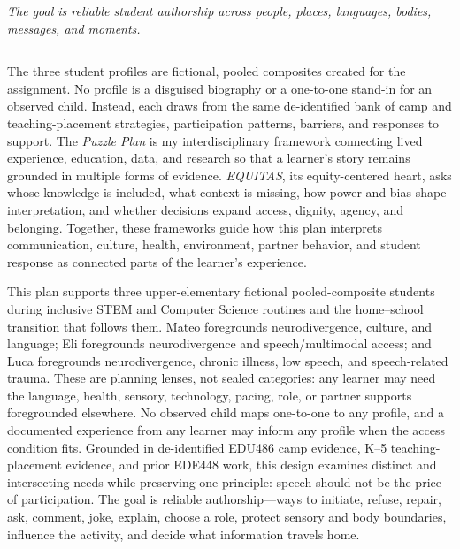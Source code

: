 \documentclass[11pt]{article}
\newcommand{\reviewsection}[1]{%
  \Needspace{4\baselineskip}
  \vspace{0.08in}\noindent{\normalsize\bfseries\color{PrimaryRed}#1}
  \par\vspace{0.025in}
}
\begin{document}
\begin{titlepage}
\vfill

\begin{center}
\begin{minipage}{1.00\textwidth}
\centering\itshape
The goal is reliable student authorship across people, places, languages, bodies, messages, and moments.\\
{\color{PrimaryRed}\rule{4.4in}{0.8pt}}
\end{minipage}
\end{center}

\vfill

\begin{center}
\begin{minipage}{0.99\textwidth}
\small
The three student profiles are fictional, pooled composites created for the assignment. No profile is a disguised biography or a one-to-one stand-in for an observed child. Instead, each draws from the same de-identified bank of camp and teaching-placement strategies, participation patterns, barriers, and responses to support. The \textit{Puzzle Plan} is my interdisciplinary framework connecting lived experience, education, data, and research so that a learner's story remains grounded in multiple forms of evidence. \textit{EQUITAS}, its equity-centered heart, asks whose knowledge is included, what context is missing, how power and bias shape interpretation, and whether decisions expand access, dignity, agency, and belonging. Together, these frameworks guide how this plan interprets communication, culture, health, environment, partner behavior, and student response as connected parts of the learner's experience.
\end{minipage}
\end{center}

\restoregeometry
\end{titlepage}
\hypersetup{pageanchor=true}

\reviewsection{Purpose and Student Design}
\vspace{-0.2cm}
This plan supports three upper-elementary fictional pooled-composite students during inclusive STEM and Computer Science routines and the home--school transition that follows them. Mateo foregrounds neurodivergence, culture, and language; Eli foregrounds neurodivergence and speech/multimodal access; and Luca foregrounds neurodivergence, chronic illness, low speech, and speech-related trauma. These are planning lenses, not sealed categories: any learner may need the language, health, sensory, technology, pacing, role, or partner supports foregrounded elsewhere. No observed child maps one-to-one to any profile, and a documented experience from any learner may inform any profile when the access condition fits. Grounded in de-identified EDU486 camp evidence, K--5 teaching-placement evidence, and prior EDE448 work, this design examines distinct and intersecting needs while preserving one principle: speech should not be the price of participation. The goal is reliable authorship---ways to initiate, refuse, repair, ask, comment, joke, explain, choose a role, protect sensory and body boundaries, influence the activity, and decide what information travels home.
\end{document}
